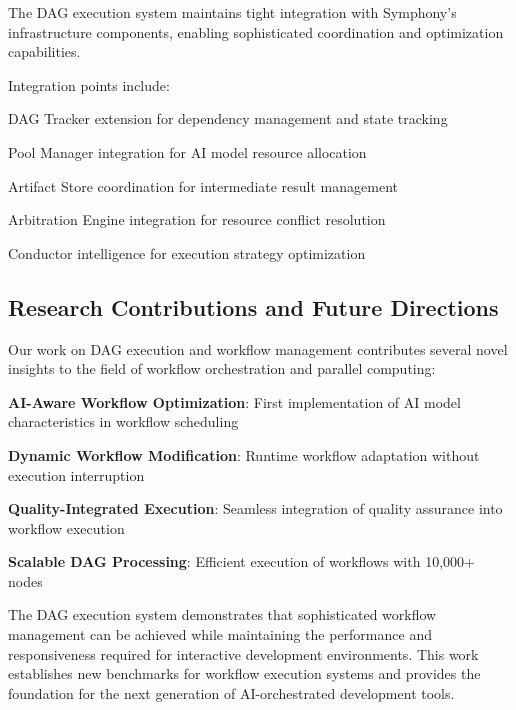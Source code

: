 The DAG execution system maintains tight integration with Symphony's infrastructure components, enabling sophisticated coordination and optimization capabilities.

Integration points include:

\begin{compactlist}
    \item DAG Tracker extension for dependency management and state tracking
    \item Pool Manager integration for AI model resource allocation
    \item Artifact Store coordination for intermediate result management
    \item Arbitration Engine integration for resource conflict resolution
    \item Conductor intelligence for execution strategy optimization
\end{compactlist}

\subsection*{Research Contributions and Future Directions}

Our work on DAG execution and workflow management contributes several novel insights to the field of workflow orchestration and parallel computing:

\begin{expandedlist}
    \item \textbf{AI-Aware Workflow Optimization}: First implementation of AI model characteristics in workflow scheduling
    \item \textbf{Dynamic Workflow Modification}: Runtime workflow adaptation without execution interruption
    \item \textbf{Quality-Integrated Execution}: Seamless integration of quality assurance into workflow execution
    \item \textbf{Scalable DAG Processing}: Efficient execution of workflows with 10,000+ nodes
\end{expandedlist}

The DAG execution system demonstrates that sophisticated workflow management can be achieved while maintaining the performance and responsiveness required for interactive development environments. This work establishes new benchmarks for workflow execution systems and provides the foundation for the next generation of AI-orchestrated development tools.
